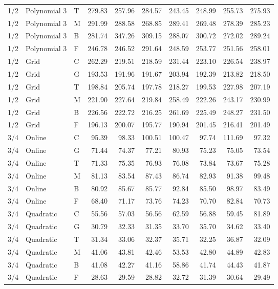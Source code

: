\begin{longtable}{lllrrrrrrr}
1/2 & Polynomial 3 & T & 279.83 & 257.96 & 284.57 & 243.45 & 248.99 & 255.73 & 275.93 \\
1/2 & Polynomial 3 & M & 291.99 & 288.58 & 268.85 & 289.41 & 269.48 & 278.39 & 285.23 \\
1/2 & Polynomial 3 & B & 281.74 & 347.26 & 309.15 & 288.07 & 300.72 & 272.02 & 289.24 \\
1/2 & Polynomial 3 & F & 246.78 & 246.52 & 291.64 & 248.59 & 253.77 & 251.56 & 258.01 \\
1/2 & Grid & C & 262.29 & 219.51 & 218.59 & 231.44 & 223.10 & 226.54 & 238.97 \\
1/2 & Grid & G & 193.53 & 191.96 & 191.67 & 203.94 & 192.39 & 213.82 & 218.50 \\
1/2 & Grid & T & 198.84 & 205.74 & 197.78 & 218.27 & 199.53 & 227.98 & 207.19 \\
1/2 & Grid & M & 221.90 & 227.64 & 219.84 & 258.49 & 222.26 & 243.17 & 230.99 \\
1/2 & Grid & B & 226.56 & 222.72 & 216.25 & 261.69 & 225.49 & 248.27 & 231.50 \\
1/2 & Grid & F & 196.13 & 200.07 & 195.77 & 190.94 & 201.45 & 216.41 & 201.49 \\
3/4 & Online & C & 95.39 & 98.33 & 100.51 & 100.47 & 97.74 & 111.69 & 97.32 \\
3/4 & Online & G & 71.44 & 74.37 & 77.21 & 80.93 & 75.23 & 75.05 & 73.54 \\
3/4 & Online & T & 71.33 & 75.35 & 76.93 & 76.08 & 73.84 & 73.67 & 75.28 \\
3/4 & Online & M & 81.13 & 83.54 & 87.43 & 86.74 & 82.93 & 91.38 & 99.48 \\
3/4 & Online & B & 80.92 & 85.67 & 85.77 & 92.84 & 85.50 & 98.97 & 83.49 \\
3/4 & Online & F & 68.40 & 71.17 & 73.76 & 74.23 & 70.70 & 82.84 & 70.73 \\
3/4 & Quadratic & C & 55.56 & 57.03 & 56.56 & 62.59 & 56.88 & 59.45 & 81.89 \\
3/4 & Quadratic & G & 30.79 & 32.33 & 31.35 & 33.70 & 35.70 & 34.62 & 33.40 \\
3/4 & Quadratic & T & 31.34 & 33.06 & 32.37 & 35.71 & 32.25 & 36.87 & 32.09 \\
3/4 & Quadratic & M & 41.06 & 43.81 & 42.46 & 53.53 & 42.80 & 44.89 & 42.83 \\
3/4 & Quadratic & B & 41.08 & 42.27 & 41.16 & 58.86 & 41.74 & 44.43 & 41.87 \\
3/4 & Quadratic & F & 28.63 & 29.59 & 28.82 & 32.72 & 31.39 & 30.64 & 29.49 \\

\end{longtable}
